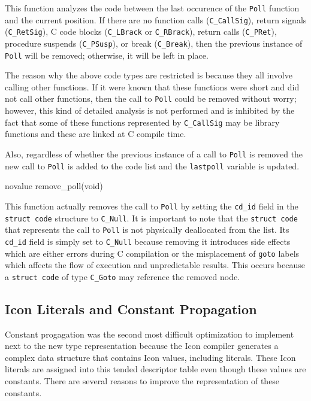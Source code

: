 This function analyzes the code between the last occurence of the
\texttt{Poll} function and the current position. If there are no
function calls (\texttt{C\_CallSig}), return signals
(\texttt{C\_RetSig}), C code blocks (\texttt{C\_LBrack} or
\texttt{C\_RBrack}), return calls (\texttt{C\_PRet}), procedure
suspends (\texttt{C\_PSusp}), or break (\texttt{C\_Break}), then the
previous instance of \texttt{Poll} will be removed; otherwise, it will
be left in place.

The reason why the above code types are restricted is because they all
involve calling other functions. If it were known that these functions
were short and did not call other functions, then the call to
\texttt{Poll} could be removed without worry; however, this kind of
detailed analysis is not performed and is inhibited by the fact that
some of these functions represented by \texttt{C\_CallSig} may be
library functions and these are linked at C compile time.

Also, regardless of whether the previous instance of a call to
\texttt{Poll} is removed the new call to \texttt{Poll} is added to the
code list and the \texttt{lastpoll} variable is updated.

{\ttfamily\mdseries
novalue remove\_poll(void)}


This function actually removes the call to \texttt{Poll} by setting
the \texttt{cd\_id} field in the \texttt{struct code} structure to
\texttt{C\_Null}. It is important to note that the \texttt{struct
code} that represents the call to \texttt{Poll} is not physically
deallocated from the list. Its \texttt{cd\_id} field is simply set
to \texttt{C\_Null} because removing it introduces side effects which
are either errors during C compilation or the misplacement of
\texttt{goto} labels which affects the flow of execution and
unpredictable results. This occurs because a \texttt{struct code}
of type \texttt{C\_Goto} may reference the removed node.

\subsection{Icon Literals and Constant Propagation}

Constant progagation was the second most difficult optimization to
implement next to the new type representation because the Icon
compiler generates a complex data structure that contains Icon values,
including literals. These Icon literals are assigned into this tended
descriptor table even though these values are constants. There are
several reasons to improve the representation of these constants.

